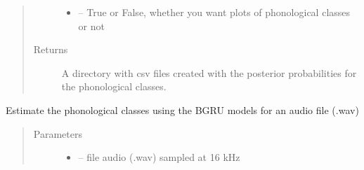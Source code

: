 \documentclass[letterpaper,10pt,english]{sphinxmanual}
\begin{document}
\begin{fulllineitems}
\begin{fulllineitems}
\begin{quote}
\begin{description}
\begin{itemize}
\item {} 
 -- True or False, whether you want plots of phonological classes or not

\end{itemize}

\item[{Returns}] \leavevmode
A directory with csv files created with the posterior probabilities for the phonological classes.

\end{description}\end{quote}

\begin{sphinxVerbatim}[commandchars=\\\{\}]
\PYG{p}{[}     \PYG{p}{]}
 
\end{sphinxVerbatim}

\end{fulllineitems}


\begin{fulllineitems}
\label{\detokenize{index:phonet.Phonet.get_phon_wav}}
Estimate the phonological classes using the BGRU models for an audio file (.wav)
\begin{quote}\begin{description}
\item[{Parameters}] \leavevmode\begin{itemize}
\item {} 
 -- file audio (.wav) sampled at 16 kHz


\end{itemize}
\end{description}
\end{quote}
\end{fulllineitems}
\end{fulllineitems}
\end{document}
